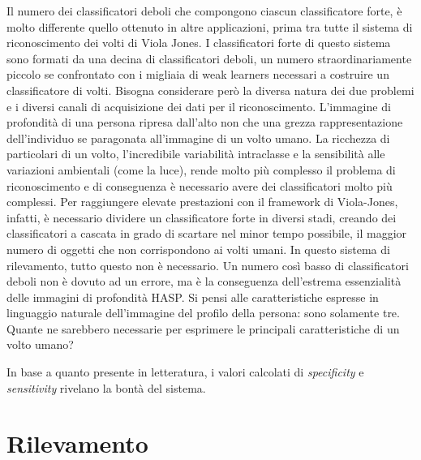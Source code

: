             Il numero dei classificatori deboli che compongono ciascun classificatore forte, è molto differente quello ottenuto in altre applicazioni, prima tra tutte il sistema di riconoscimento dei volti di Viola Jones.
            I classificatori forte di questo sistema sono formati da una decina di classificatori deboli, un numero straordinariamente piccolo se confrontato con i migliaia di weak learners necessari a costruire un classificatore di volti.
            Bisogna considerare però la diversa natura dei due problemi e i diversi canali di acquisizione dei dati per il riconoscimento. L'immagine di profondità di una persona ripresa dall'alto non che una grezza rappresentazione dell'individuo se paragonata all'immagine di un volto umano.
            La ricchezza di particolari di un volto, l'incredibile variabilità intraclasse e la sensibilità alle variazioni ambientali (come la luce), rende molto più complesso il problema di riconoscimento e di conseguenza è necessario avere dei classificatori molto più complessi.
            Per raggiungere elevate prestazioni con il framework di Viola-Jones, infatti, è necessario dividere un classificatore forte in diversi stadi, creando dei classificatori a cascata in grado di scartare nel minor tempo possibile, il maggior numero di oggetti che non corrispondono ai volti umani.
            In questo sistema di rilevamento, tutto questo non è necessario. Un numero così basso di classificatori deboli non è dovuto ad un errore, ma è la conseguenza dell'estrema essenzialità delle immagini di profondità HASP.
            Si pensi alle caratteristiche espresse in linguaggio naturale dell'immagine del profilo della persona: sono solamente tre. Quante ne sarebbero necessarie per esprimere le principali caratteristiche di un volto umano?

            In base a quanto presente in letteratura, i valori calcolati di \emph{specificity} e \emph{sensitivity} rivelano la bontà del sistema.


\chapter{Rilevamento}
\label{chap:rilevamento}
